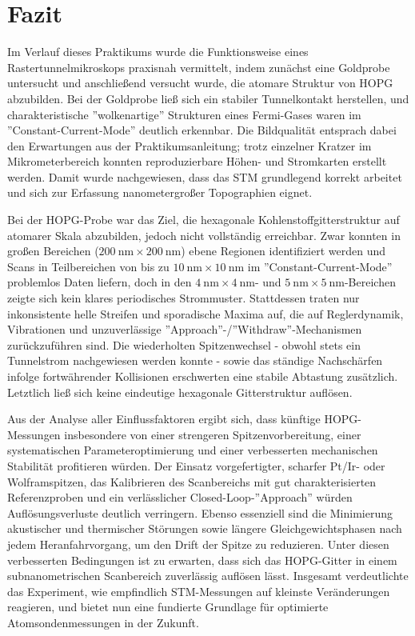 \chapter{Fazit}
Im Verlauf dieses Praktikums wurde die Funktionsweise eines Rastertunnelmikroskops praxisnah vermittelt, indem zunächst eine Goldprobe untersucht und anschließend versucht wurde, die atomare Struktur von HOPG abzubilden. Bei der Goldprobe ließ sich ein stabiler Tunnelkontakt herstellen, und charakteristische ''wolkenartige'' Strukturen eines Fermi-Gases waren im ''Constant-Current-Mode'' deutlich erkennbar. Die Bildqualität entsprach dabei den Erwartungen aus der Praktikumsanleitung; trotz einzelner Kratzer im Mikrometerbereich konnten reproduzierbare Höhen- und Stromkarten erstellt werden. Damit wurde nachgewiesen, dass das STM grundlegend korrekt arbeitet und sich zur Erfassung nanometergroßer Topographien eignet.

Bei der HOPG-Probe war das Ziel, die hexagonale Kohlenstoffgitterstruktur auf atomarer Skala abzubilden, jedoch nicht vollständig erreichbar. Zwar konnten in großen Bereichen ($\SI{200}{\nm} \times \SI{200}{\nm}$) ebene Regionen identifiziert werden und Scans in Teilbereichen von bis zu $\SI{10}{\nm} \times \SI{10}{\nm}$ im ''Constant-Current-Mode'' problemlos Daten liefern, doch in den $\SI{4}{\nm} \times \SI{4}{\nm}$- und $\SI{5}{\nm} \times \SI{5}{\nm}$-Bereichen zeigte sich kein klares periodisches Strommuster. Stattdessen traten nur inkonsistente helle Streifen und sporadische Maxima auf, die auf Reglerdynamik, Vibrationen und unzuverlässige ''Approach''-/''Withdraw''-Mechanismen zurückzuführen sind. Die wiederholten Spitzenwechsel - obwohl stets ein Tunnelstrom nachgewiesen werden konnte - sowie das ständige Nachschärfen infolge fortwährender Kollisionen erschwerten eine stabile Abtastung zusätzlich. Letztlich ließ sich keine eindeutige hexagonale Gitterstruktur auflösen.

Aus der Analyse aller Einflussfaktoren ergibt sich, dass künftige HOPG-Messungen insbesondere von einer strengeren Spitzenvorbereitung, einer systematischen Parameteroptimierung und einer verbesserten mechanischen Stabilität profitieren würden. Der Einsatz vorgefertigter, scharfer Pt/Ir- oder Wolframspitzen, das Kalibrieren des Scanbereichs mit gut charakterisierten Referenzproben und ein verlässlicher Closed-Loop-''Approach'' würden Auflösungsverluste deutlich verringern. Ebenso essenziell sind die Minimierung akustischer und thermischer Störungen sowie längere Gleichgewichtsphasen nach jedem Heranfahrvorgang, um den Drift der Spitze zu reduzieren. Unter diesen verbesserten Bedingungen ist zu erwarten, dass sich das HOPG-Gitter in einem subnanometrischen Scanbereich zuverlässig auflösen lässt. Insgesamt verdeutlichte das Experiment, wie empfindlich STM-Messungen auf kleinste Veränderungen reagieren, und bietet nun eine fundierte Grundlage für optimierte Atomsondenmessungen in der Zukunft.


















